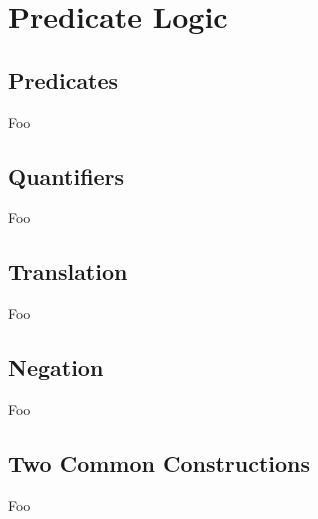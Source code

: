 \section{Predicate Logic}

\subsection{Predicates}

Foo

\subsection{Quantifiers}

Foo

\subsection{Translation}

Foo

\subsection{Negation}

Foo

\subsection{Two Common Constructions}

Foo

